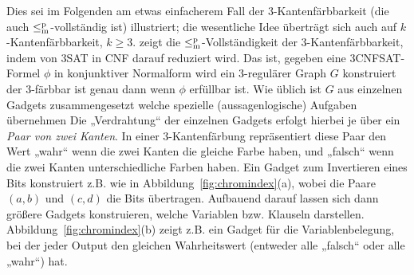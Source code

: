 Dies sei im Folgenden am etwas einfacherem Fall der 3-Kantenfärbbarkeit (die auch $\leq_\mathrm{m}^\mathrm{p}$-vollständig ist) illustriert; die wesentliche Idee überträgt sich auch auf $k$-Kantenfärbbarkeit, $k\geq 3$.
\textcite{holyer_np-completeness_1981} zeigt die $\leq_\mathrm{m}^\mathrm{p}$-Vollständigkeit der 3-Kantenfärbbarkeit, indem von 3SAT in CNF darauf reduziert wird. Das ist, gegeben eine 3CNFSAT-Formel $\phi$ in konjunktiver Normalform wird ein 3-regulärer Graph $G$ konstruiert der 3-färbbar ist genau dann wenn $\phi$ erfüllbar ist. Wie üblich ist $G$ aus einzelnen Gadgets zusammengesetzt welche spezielle (aussagenlogische) Aufgaben übernehmen 
Die „Verdrahtung“ der einzelnen Gadgets erfolgt hierbei je über ein \emph{Paar von zwei Kanten}. In einer 3-Kantenfärbung repräsentiert diese Paar den Wert „wahr“ wenn die zwei Kanten die gleiche Farbe haben, und „falsch“ wenn die zwei Kanten unterschiedliche Farben haben.
Ein Gadget zum Invertieren eines Bits konstruiert \citeauthor{holyer_np-completeness_1981} z.B. wie in Abbildung~\ref{fig:chromindex}(a), wobei die Paare $(a,b)$ und $(c,d)$ die Bits übertragen.
Aufbauend darauf lassen sich dann größere Gadgets konstruieren, welche Variablen bzw. Klauseln darstellen. Abbildung~\ref{fig:chromindex}(b) zeigt z.B. ein Gadget für die Variablenbelegung, bei der jeder Output den gleichen Wahrheitswert (entweder alle „falsch“ oder alle „wahr“) hat.

